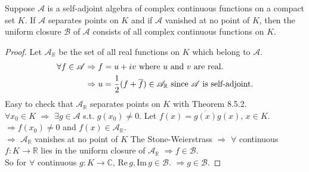 \begin{theorem}
    Suppose  $ \mathscr{A} $ is a self-adjoint algebra of complex continuous functions on a compact set  $ K  $. If  $  \mathscr{A} $ separates points on  $ K  $ and if  $  \mathscr{A } $ vanished at no point of  $ K  $, then the uniform closure  $  \mathscr{B } $ of  $  \mathscr{A } $ consists of all complex continuous functions on  $ K $.
\end{theorem}
\begin{proof}
    Let  $  \mathscr{A }_\mathbb{R}  $ be the set of all real functions on  $ K  $ which belong to  $  \mathscr{A } $.\\
    \begin{align*}
        \forall f\in  \mathscr{A }&\Rightarrow f=u+iv \text{ where  $ u  $ and  $ v  $ are real.}\\
        &\Rightarrow u=\frac{1 }{2 }(f+\overline{f})\in  \mathscr{A }_\mathbb{R} \text{ since  $  \mathscr{A } $ is self-adjoint.}
    \end{align*}
    Easy to check that  $  \mathscr{A}_\mathbb{R}  $ separates points on  $ K  $ with Theorem 8.5.2.\\
     $ \forall x_0\in K  $  $ \Rightarrow $ $ \exists g\in  \mathscr{A } $ s.t.  $ g(x_0)\not=0  $. Let  $ f(x)=\overline{g(x)}g(x),\,x\in K $.  $ \Rightarrow f(x_0)\not=0 $ and  $ f(x)\in  \mathscr{A}_\mathbb{R} $.\\
      $ \Rightarrow  $   $  \mathscr{A}_\mathbb{R} $   vanishes at no point of  $ K  $ 
    The Stone-Weierstrass $ \Rightarrow  $  $ \forall  $ continuous  $ f:K\rightarrow \mathbb{R } $ lies in the uniform closure of  $  \mathscr{A}_\mathbb{R} $ $ \Rightarrow f\in  \mathscr{B } $.\\
    So for  $ \forall  $ continuous  $ g:K\rightarrow \mathbb{C} $,  $ \text{Re}\, g,\text{Im}\, g\in  \mathscr{B} $. $ \Rightarrow g\in  \mathscr{B} $.     
\end{proof}